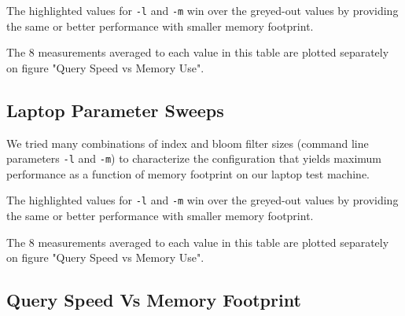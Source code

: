 \documentclass[10pt]{article}
\begin{document}
The highlighted values for \texttt{-l} and \texttt{-m} win over the greyed-out values by providing the same or better performance with smaller memory footprint.

The 8 measurements averaged to each value in this table are plotted separately on figure "Query Speed vs Memory Use".

\pagebreak
\subsection{Laptop Parameter Sweeps}


\hskip-0.75in
\vskip -0.25in
We tried many combinations of index and bloom filter sizes (command line parameters \texttt{-l} and \texttt{-m}) to characterize the configuration that yields maximum performance as a function of memory footprint on our laptop test machine.

The highlighted values for \texttt{-l} and \texttt{-m} win over the greyed-out values by providing the same or better performance with smaller memory footprint.

The 8 measurements averaged to each value in this table are plotted separately on figure "Query Speed vs Memory Use".

\pagebreak
\subsection{Query Speed Vs Memory Footprint}
\end{document}
